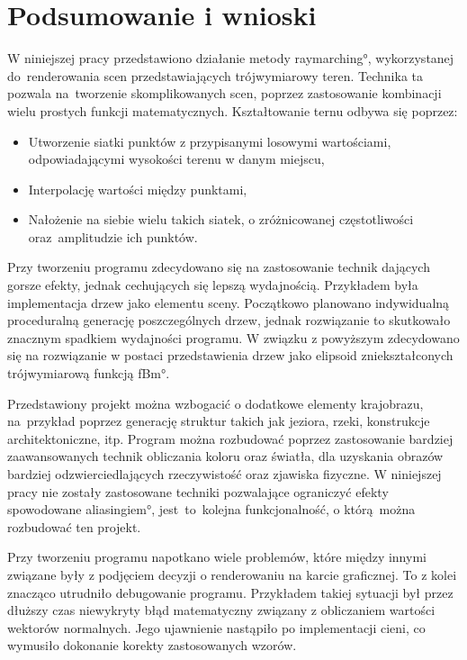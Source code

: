 \chapter{Podsumowanie i wnioski}
W niniejszej pracy przedstawiono działanie metody \ang{raymarching}, wykorzystanej do~renderowania scen przedstawiających trójwymiarowy teren.
Technika ta pozwala na~tworzenie skomplikowanych scen, poprzez zastosowanie kombinacji wielu prostych funkcji matematycznych. Kształtowanie ternu odbywa się poprzez:
\begin{itemize}
\item Utworzenie siatki punktów z przypisanymi losowymi wartościami, odpowiadającymi wysokości terenu w danym miejscu,
\item Interpolację wartości między punktami,
\item Nałożenie na siebie wielu takich siatek, o zróżnicowanej częstotliwości oraz~amplitudzie ich punktów.
\end{itemize}

Przy tworzeniu programu zdecydowano się na zastosowanie technik dających gorsze efekty, jednak cechujących się lepszą wydajnością. Przykładem była implementacja drzew jako elementu sceny. Początkowo planowano indywidualną proceduralną generację poszczególnych drzew, jednak rozwiązanie to skutkowało znacznym spadkiem wydajności programu. W związku z powyższym zdecydowano się na rozwiązanie w postaci przedstawienia drzew jako elipsoid zniekształconych trójwymiarową funkcją \ang{fBm}.

Przedstawiony projekt można wzbogacić o dodatkowe elementy krajobrazu, na~przykład
poprzez generację struktur takich jak jeziora, rzeki, konstrukcje architektoniczne, itp. Program można rozbudować poprzez zastosowanie bardziej zaawansowanych technik obliczania koloru oraz światła, dla uzyskania obrazów bardziej odzwierciedlających rzeczywistość oraz zjawiska fizyczne. W niniejszej pracy nie zostały zastosowane techniki pozwalające ograniczyć efekty spowodowane \ang{aliasingiem}, jest~to~kolejna funkcjonalność, o którą można rozbudować ten projekt.

Przy tworzeniu programu napotkano wiele problemów, które między innymi związane były z podjęciem decyzji o renderowaniu na karcie graficznej. To z kolei znacząco utrudniło debugowanie programu. Przykładem takiej sytuacji był przez dłuższy czas niewykryty błąd matematyczny związany z obliczaniem wartości wektorów normalnych. Jego ujawnienie nastąpiło po implementacji cieni, co wymusiło dokonanie korekty zastosowanych wzorów.

